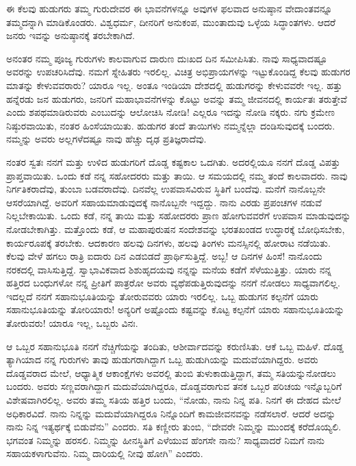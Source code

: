 ಈ ಕೆಲವು ಹುಡುಗರು ತಮ್ಮ ಗುರುದೇವರ ಈ ಭಾವನೆಗಳನ್ನೂ ಅವುಗಳ ಫಲವಾದ ಅನುಷ್ಠಾನ ವೇದಾಂತವನ್ನೂ ತಮ್ಮದನ್ನಾಗಿ ಮಾಡಿಕೊಂಡರು. ವಿಶ್ವಧರ್ಮ, ದೀನರಿಗೆ ಅನುಕಂಪ, ಮುಂತಾದುವು ಒಳ್ಳೆಯ ಸಿದ್ಧಾಂತಗಳು. ಆದರೆ ಜನರು ಇವನ್ನು ಅನುಷ್ಠಾನಕ್ಕೆ ತರಬೇಕಾಗಿದೆ.

ಅನಂತರ ನಮ್ಮ ಪೂಜ್ಯ ಗುರುಗಳು ಕಾಲವಾಗುವ ದಾರುಣ ದುಃಖದ ದಿನ ಸಮೀಪಿಸಿತು. ನಾವು ಸಾಧ್ಯವಾದಷ್ಟೂ ಅವರನ್ನು ಉಪಚರಿಸಿದೆವು. ನಮಗೆ ಸ್ನೇಹಿತರು ಇರಲಿಲ್ಲ. ವಿಚಿತ್ರ ಅಭಿಪ್ರಾಯಗಳನ್ನು ಇಟ್ಟುಕೊಂಡಿದ್ದ ಕೆಲವು ಹುಡುಗರ ಮಾತನ್ನು ಕೇಳುವವರಾರು? ಯಾರೂ ಇಲ್ಲ. ಅಂತೂ ಇಂಡಿಯಾ ದೇಶದಲ್ಲಿ ಹುಡುಗರನ್ನು ಕೇಳುವವರೇ ಇಲ್ಲ. ಹತ್ತು ಹನ್ನೆರಡು ಜನ ಹುಡುಗರು, ಜನರಿಗೆ ಮಹಾಭಾವನೆಗಳನ್ನು ಕೊಟ್ಟು ಅವನ್ನು ತಮ್ಮ ಜೀವನದಲ್ಲಿ ಕಾರ್ಯತಃ ತರುತ್ತೇವೆ ಎಂದು ಶಪಥಮಾಡಿರುವರು ಎಂಬುದನ್ನು ಆಲೋಚಿಸಿ ನೋಡಿ! ಎಲ್ಲರೂ ಇದನ್ನು ನೋಡಿ ನಕ್ಕರು. ನಗು ಕ್ರಮೇಣ ನಿಷ್ಠುರವಾಯಿತು, ನಂತರ ಹಿಂಸೆಯಾಯಿತು. ಹುಡುಗರ ತಂದೆ ತಾಯಿಗಳು ನಮ್ಮನ್ನೆಲ್ಲಾ ದಂಡಿಸುವುದಕ್ಕೆ ಬಂದರು. ನಮ್ಮನ್ನು ಅವರು ಅಲ್ಲಗಳೆದಷ್ಟೂ ನಾವು ಹೆಚ್ಚು ದೃಢ ಪ್ರತಿಜ್ಞರಾದೆವು.

ನಂತರ ಸ್ವತಃ ನನಗೆ ಮತ್ತು ಉಳಿದ ಹುಡುಗರಿಗೆ ದೊಡ್ಡ ಕಷ್ಟಕಾಲ ಒದಗಿತು. ಅದರಲ್ಲಿಯೂ ನನಗೆ ದೊಡ್ಡ ವಿಪತ್ತು ಪ್ರಾಪ್ತವಾಯಿತು. ಒಂದು ಕಡೆ ನನ್ನ ಸಹೋದರರು ಮತ್ತು ತಾಯಿ. ಆ ಸಮಯದಲ್ಲಿ ನಮ್ಮ ತಂದೆ ಕಾಲವಾದರು. ನಾವು ನಿರ್ಗತಿಕರಾದೆವು, ತುಂಬಾ ಬಡವರಾದೆವು. ದಿನವೆಲ್ಲ ಉಪವಾಸವಿರುವ ಸ್ಥಿತಿಗೆ ಬಂದೆವು. ಮನೆಗೆ ನಾನೊಬ್ಬನೇ ಆಸರೆಯಾಗಿದ್ದೆ. ಅವರಿಗೆ ಸಹಾಯಮಾಡುವುದಕ್ಕೆ ನಾನೊಬ್ಬನೇ ಇದ್ದದ್ದು. ನಾನು ಎರಡು ಪ್ರಪಂಚಗಳ ನಡುವೆ ನಿಲ್ಲಬೇಕಾಯಿತು. ಒಂದು ಕಡೆ, ನನ್ನ ತಾಯಿ ಮತ್ತು ಸಹೋದರರು ಪ್ರಾಣ ಹೋಗುವವರೆಗೆ ಉಪವಾಸ ಮಾಡುವುದನ್ನು ನೋಡಬೇಕಾಗಿತ್ತು. ಮತ್ತೊಂದು ಕಡೆ, ಆ ಮಹಾಪುರುಷನ ಸಂದೇಶವನ್ನು ಭರತಖಂಡದ ಉದ್ಧಾರಕ್ಕೆ ಬೋಧಿಸಬೇಕು, ಕಾರ್ಯರೂಪಕ್ಕೆ ತರಬೇಕು. ಆದಕಾರಣ ಹಲವು ದಿನಗಳು, ಹಲವು ತಿಂಗಳು ಮನಸ್ಸಿನಲ್ಲಿ ಹೋರಾಟ ನಡೆಯಿತು. ಕೆಲವು ವೇಳೆ ಹಗಲು ರಾತ್ರಿ ಐದಾರು ದಿನ ಎಡಬಿಡದೆ ಪ್ರಾರ್ಥಿಸುತ್ತಿದ್ದೆ. ಅಬ್ಬ! ಆ ದಿನಗಳ ಹಿಂಸೆ! ನಾನೊಂದು ನರಕದಲ್ಲಿ ವಾಸಿಸುತ್ತಿದ್ದೆ. ಸ್ವಾಭಾವಿಕವಾದ ಶಿಶುಹೃದಯವು ನನ್ನನ್ನು ಮನೆಯ ಕಡೆಗೆ ಸೆಳೆಯುತ್ತಿತ್ತು. ಯಾರು ನನ್ನ ಹತ್ತಿರದ ಬಂಧುಗಳೋ ನನ್ನ ಪ್ರೀತಿಗೆ ಪಾತ್ರರೋ ಅವರು ವ್ಯಥೆಪಡುತ್ತಿರುವುದನ್ನು ನನಗೆ ನೋಡಲು ಸಾಧ್ಯವಾಗಲಿಲ್ಲ. ಇದಲ್ಲದೆ ನನಗೆ ಸಹಾನುಭೂತಿಯನ್ನು ತೋರುವವರು ಯಾರು ಇರಲಿಲ್ಲ. ಒಬ್ಬ ಹುಡುಗನ ಕಲ್ಪನೆಗೆ ಯಾರು ಸಹಾನುಭೂತಿಯನ್ನು ತೋರಿಯಾರು! ಅನ್ಯರಿಗೆ ಅಷ್ಟೊಂದು ಕಷ್ಟವನ್ನು ಕೊಟ್ಟ ಕಲ್ಪನೆಗೆ ಯಾರು ಸಹಾನುಭೂತಿಯನ್ನು ತೋರುವರು! ಯಾರೂ ಇಲ್ಲ, ಒಬ್ಬರು ವಿನಃ.

ಆ ಒಬ್ಬರ ಸಹಾನುಭೂತಿ ನನಗೆ ನೆಚ್ಚಿಗೆಯನ್ನು ತಂದಿತು, ಆಶೀರ್ವಾದವನ್ನು ಕರುಣಿಸಿತು. ಆಕೆ ಒಬ್ಬ ಮಹಿಳೆ. ದೊಡ್ಡ ತ್ಯಾಗಿಯಾದ ನನ್ನ ಗುರುಗಳು ತಾವು ಹುಡುಗರಾಗಿದ್ದಾಗ ಒಬ್ಬ ಹುಡುಗಿಯನ್ನು ಮದುವೆಯಾಗಿದ್ದರು. ಅವರು ದೊಡ್ಡವರಾದ ಮೇಲೆ, ಆಧ್ಯಾತ್ಮಿಕ ಆಕಾಂಕ್ಷೆಗಳು ಅವರಲ್ಲಿ ತುಂಬಿ ತುಳುಕಾಡುತ್ತಿದ್ದಾಗ, ತಮ್ಮ ಸತಿಯನ್ನು\break ನೋಡಲು ಬಂದರು. ಅವರು ಸಣ್ಣವರಾಗಿದ್ದಾಗ ಮದುವೆಯಾಗಿದ್ದರೂ, ದೊಡ್ಡವರಾಗುವ ತನಕ ಒಬ್ಬರ ಪರಿಚಯ ಇನ್ನೊಬ್ಬರಿಗೆ ವಿಶೇಷವಾಗಿರಲಿಲ್ಲ. ಅವರು ತಮ್ಮ ಸತಿಯ ಹತ್ತಿರ ಬಂದು, “ನೋಡು, ನಾನು ನಿನ್ನ ಪತಿ. ನಿನಗೆ ಈ ದೇಹದ ಮೇಲೆ ಅಧಿಕಾರವಿದೆ. ನಾನು ನಿನ್ನನ್ನು ಮದುವೆಯಾಗಿದ್ದರೂ ನಿನ್ನೊಂದಿಗೆ ಕಾಮಜೀವನವನ್ನು ನಡೆಸಲಾರೆ. ಆದರೆ ಅದನ್ನು ನಾನು ನಿನ್ನ ಇತ್ಯರ್ಥಕ್ಕೆ ಬಿಡುವೆನು'' ಎಂದರು. ಸತಿ ಕಣ್ಣೀರು ತುಂಬಿ, “ದೇವರೇ ನಿಮ್ಮನ್ನು ಮುಂದಕ್ಕೆ ಕರೆದೊಯ್ಯಲಿ. ಭಗವಂತ ನಿಮ್ಮನ್ನು ಹರಸಲಿ. ನಿಮ್ಮನ್ನು ಹೀನಸ್ಥಿತಿಗೆ ಎಳೆಯುವ ಹೆಂಗಸೇ ನಾನು? ಸಾಧ್ಯವಾದರೆ ನಿಮಗೆ ನಾನು ಸಹಾಯಕಳಾಗುವೆನು. ನಿಮ್ಮ ದಾರಿಯಲ್ಲಿ ನೀವು ಹೋಗಿ” ಎಂದರು.


